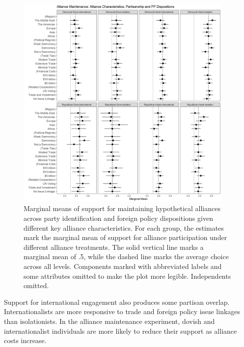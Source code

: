 \documentclass[12pt]{article}
\begin{document}
\begin{figure}
	\centering
		\includegraphics[width=0.95\textwidth]{party-dispo-main-char.png}
	\caption{Marginal means of support for maintaining hypothetical alliances across party identification and foreign policy dispositions given different key alliance characteristics. For each group, the estimates mark the marginal mean of support for alliance participation under different alliance treatments. The solid vertical line marks a marginal mean of .5, while the dashed line marks the average choice across all levels. Components marked with abbreviated labels and some attributes omitted to make the plot more legible. Independents omitted.}
	\label{fig:party-dispo-main-char}
\end{figure}


Support for international engagement also produces some partisan overlap. 
Internationalists are more responsive to trade and foreign policy issue linkages than isolationists. 
In the alliance maintenance experiment, dovish and internationalist individuals are more likely to reduce their support as alliance costs increase.


\end{document}
